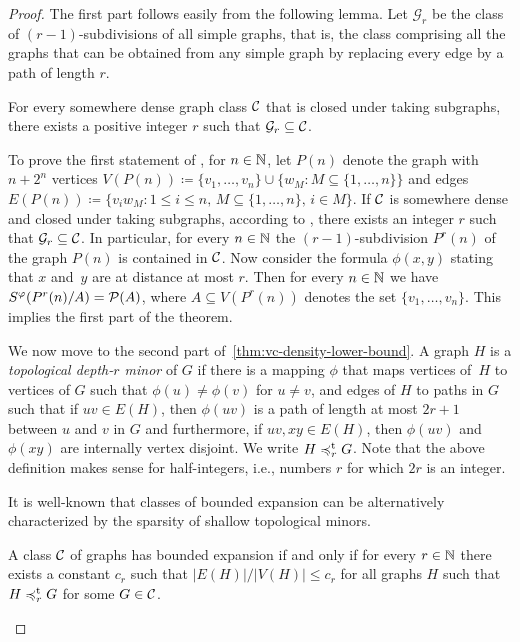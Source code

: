 \begin{proof}
The first part follows easily from the following lemma.
Let $\mathcal{G}_r$ be the class of $(r-1)$-subdivisions of all 
simple graphs, that is, the class comprising
all the graphs that can be obtained from any simple graph by replacing every edge by a path of
length $r$.

\begin{lemma}\label{lem:lower-nd}
For every somewhere dense graph class $\mathcal{C}$ that is closed 
under taking subgraphs, there
exists a positive integer $r$ such that $\mathcal{G}_{r}\subseteq \mathcal{C}$.
\end{lemma}

To prove the first statement of , 
for $n\in \mathbb{N}$, let $P(n)$ denote the graph with $n+2^n$ 
vertices $V(P(n))\coloneqq \{v_1,\ldots, v_n\}\cup \{w_M \colon M\subseteq \{1,\ldots, n\}\}$ and edges $E(P(n))\coloneqq \{v_iw_M \colon 1\leq i\leq n,\, M\subseteq \{1,\ldots, n\},\, i\in M\}$. 
If $\mathcal{C}$ is somewhere dense and closed under taking subgraphs, 
according to , there exists an integer $r$ 
such that $\mathcal{G}_{r}\subseteq \mathcal{C}$. In particular, for every $n\in \mathbb{N}$ the $(r-1)$-subdivision $P^{r}(n)$ of the graph $P(n)$ is contained in $\mathcal{C}$.
Now consider 
the formula $\phi(x,y)$ stating that $x$ and~$y$ are at distance at most $r$. Then for every $n\in \mathbb{N}$ we have 
$S^\varphi(P^{r}(n)/A)=\mathcal{P}(A)$, where $A\subseteq V(P^{r}(n))$ denotes the set $\{v_1,\ldots, v_n\}$. This implies the first part
of the theorem. 

\medskip
We now move to the  second part of~\cref{thm:vc-density-lower-bound}.
A graph $H$ is a \emph{topological depth-$r$ minor} of $G$ if
there is a mapping $\phi$ that maps vertices of~$H$ to 
vertices of $G$ such that $\phi(u)\neq \phi(v)$ for 
$u\neq v$, and edges of $H$ to paths in 
$G$ such that if $uv\in E(H)$, then $\phi(uv)$
is a path of length at most $2r+1$ between $u$ and $v$ in 
$G$ and furthermore, if $uv, xy\in E(H)$, then 
$\phi(uv)$ and $\phi(xy)$ are internally vertex
disjoint. We write $H\preccurlyeq_r^{\mathrm{t}} G$. 
Note that the above definition makes sense for 
half-integers, i.e., numbers $r$ for which $2r$ is an integer.

It is well-known that classes of bounded expansion can be alternatively characterized by the sparsity of shallow topological minors.

\begin{lemma}\label{lem:top-bnd-exp}
A class $\mathcal{C}$ of graphs has bounded expansion if and only 
if for every $r\in \mathbb{N}$ there exists a constant $c_r$ such that $|E(H)|/|V(H)|\leq c_r$ for all graphs $H$ such that $H\preccurlyeq_r^{\mathrm{t}} G $ for some $G\in \mathcal{C}$.
\end{lemma}


\end{proof}
